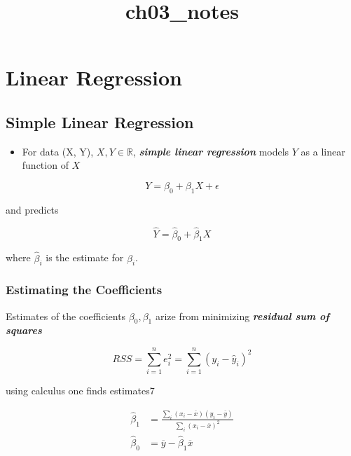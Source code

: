 \documentclass[11pt]{article}
\title{ch03\_notes}
\providecommand{\tightlist}{%
      \setlength{\itemsep}{0pt}\setlength{\parskip}{0pt}}
\begin{document}
    
    
    \maketitle
    
    

    
    \hypertarget{linear-regression}{%
\section{Linear Regression}\label{linear-regression}}

    \hypertarget{simple-linear-regression}{%
\subsection{Simple Linear Regression}\label{simple-linear-regression}}

    \begin{itemize}
\tightlist
\item
  For data (X, Y), \(X, Y\in\mathbb{R}\), \textbf{\emph{simple linear
  regression}} models \(Y\) as a linear function of \(X\)
\end{itemize}

\[Y = \beta_0 + \beta_1 X + \epsilon\]

and predicts

\[\hat{Y} = \hat{\beta}_0 + \hat{\beta}_1 X\]

where \(\hat{\beta}_i\) is the estimate for \(\beta_i\).

    \hypertarget{estimating-the-coefficients}{%
\subsubsection{Estimating the
Coefficients}\label{estimating-the-coefficients}}

    Estimates of the coefficients \(\beta_0, \beta_1\) arize from minimizing
\textbf{\emph{residual sum of squares}}

\[RSS = \sum_{i=1}^n e_i^2 = \sum_{i=1}^n (y_i - \hat{y}_i)^2\]

using calculus one finds estimates7

\begin{align*}
\hat{\beta}_1 &= \frac{\sum_i (x_i - \overline{x})(y_i - \overline{y})}{\sum_i (x_i - \overline{x}) ^2}\\
\hat{\beta}_0 &= \overline{y}-\hat{\beta}_1\overline{x}
\end{align*}
\end{document}
